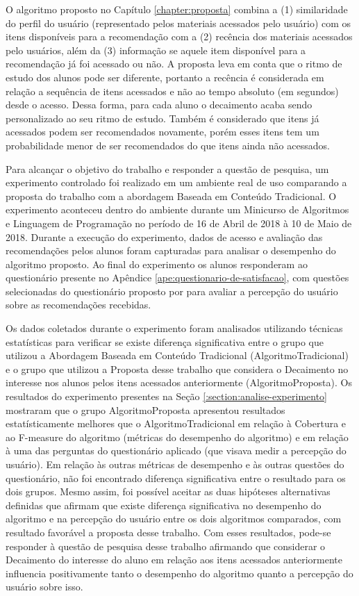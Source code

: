 O algoritmo proposto no Capítulo \ref{chapter:proposta} combina a (1) similaridade do perfil do usuário (representado
pelos materiais acessados pelo usuário) com os itens disponíveis para a recomendação com a (2) recência dos materiais
acessados pelo usuários, além da (3) informação se aquele item disponível para a recomendação já foi acessado ou não. A
proposta leva em conta que o ritmo de estudo dos alunos pode ser diferente, portanto a recência é considerada em relação
a sequência de itens acessados e não ao tempo absoluto (em segundos) desde o acesso. Dessa forma, para cada aluno o
decaimento acaba sendo personalizado ao seu ritmo de estudo. Também é considerado que itens já acessados podem ser
recomendados novamente, porém esses itens tem um probabilidade menor de ser recomendados do que itens ainda não acessados.

Para alcançar o objetivo do trabalho e responder a questão de pesquisa, um experimento controlado foi realizado em um ambiente
real de uso comparando a proposta do trabalho com a abordagem Baseada em Conteúdo Tradicional. O experimento aconteceu
dentro do ambiente \adaptwebspace durante um Minicurso de Algoritmos e Linguagem de Programação no período de 16 de Abril de
2018 à 10 de Maio de 2018. Durante a execução do experimento, dados de acesso e avaliação das recomendações pelos alunos
foram capturadas para analisar o desempenho do algoritmo proposto. Ao final do experimento os alunos responderam ao questionário presente no Apêndice
\ref{ape:questionario-de-satisfacao}, com questões selecionadas do questionário proposto por  para
avaliar a percepção do usuário sobre as recomendações recebidas.

Os dados coletados durante o experimento foram analisados utilizando técnicas estatísticas para verificar se existe
diferença significativa entre o grupo que utilizou a Abordagem Baseada em Conteúdo Tradicional (AlgoritmoTradicional)
e o grupo que utilizou a Proposta desse trabalho que considera o Decaimento no interesse nos alunos pelos itens acessados
anteriormente (AlgoritmoProposta). Os resultados do experimento presentes na Seção \ref{:section:analise-experimento}
mostraram que o grupo AlgoritmoProposta apresentou resultados estatísticamente melhores que o AlgoritmoTradicional em
relação à Cobertura e ao F-measure do algoritmo (métricas do desempenho do algoritmo) e em relação à uma das perguntas
do questionário aplicado (que visava medir a percepção do usuário). Em relação às outras métricas de desempenho e às
outras questões do questionário, não foi encontrado diferença significativa entre o resultado para os dois grupos.
Mesmo assim, foi possível aceitar as duas hipóteses alternativas definidas que afirmam que existe diferença significativa
no desempenho do algoritmo e na percepção do usuário entre os dois algoritmos comparados, com resultado favorável
a proposta desse trabalho. Com esses resultados, pode-se responder à questão de pesquisa desse trabalho afirmando que
considerar o Decaimento do interesse do aluno em relação aos itens acessados anteriormente influencia positivamente
tanto o desempenho do algoritmo quanto a percepção do usuário sobre isso.

